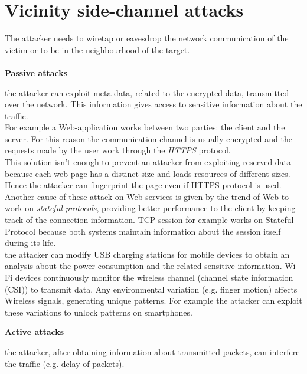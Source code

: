 \section{Vicinity side-channel attacks}
The attacker needs to wiretap or eavesdrop the network communication of the victim or to be in the neighbourhood of the target.\\\\
\textbf{Passive attacks}
\begin{itemize}
{the attacker can exploit meta data, related to the encrypted data, transmitted over the network. This information gives access to sensitive information about the traffic.\\
For example a Web-application works between two parties: the client and the server. For this reason the communication channel is usually encrypted and the requests made by the user work through the \textit{HTTPS} protocol.\\
This solution isn't enough to prevent an attacker from exploiting reserved data because each web page has a distinct size and loads resources of different sizes. Hence the attacker can fingerprint the page even if HTTPS protocol is used.\\
Another cause of these attack on Web-services is given by the trend of Web to work on \textit{stateful protocols}, providing better performance to the client by keeping track of the connection information. TCP session for example works on Stateful Protocol because both systems maintain information about the session itself during its life\cite{side_leaks}.\\}
{the attacker can modify USB charging stations for mobile devices to obtain an analysis about the power consumption and the related sensitive information.}
{Wi-Fi devices continuously monitor the wireless channel (channel state information (CSI)) to transmit data. Any environmental variation (e.g. finger motion) affects Wireless signals, generating unique patterns. For example the attacker can exploit these variations to unlock patterns on smartphones\cite{side_CSI}.}
\end{itemize}
\textbf{Active attacks}
\begin{itemize}
{the attacker, after obtaining information about transmitted packets, can interfere the traffic (e.g. delay of packets).}
\end{itemize}


